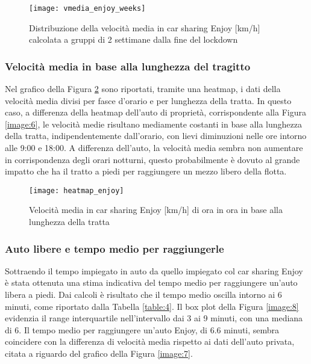 \begin{figure}
	\centering
	\texttt{[image: vmedia\_enjoy\_weeks]}
	\caption{Distribuzione della velocità media in car sharing Enjoy [km/h] calcolata a gruppi di 2 settimane dalla fine del lockdown}
	\label{image:28}
\end{figure}

\subsubsection{Velocità media in base alla lunghezza del tragitto}

Nel grafico della Figura \ref{image:30} sono riportati, tramite una heatmap, i dati della velocità media divisi per fasce d'orario e per lunghezza della tratta. In questo caso, a differenza della heatmap dell'auto di proprietà, corrispondente alla Figura \ref{image:6}, le velocità medie risultano mediamente costanti in base alla lunghezza della tratta, indipendentemente dall'orario, con lievi diminuzioni nelle ore intorno alle 9:00 e 18:00. A differenza dell'auto, la velocità media sembra non aumentare in corrispondenza degli orari notturni, questo probabilmente è dovuto al grande impatto che ha il tratto a piedi per raggiungere un mezzo libero della flotta.

\begin{figure}[H]
	\centering
	\texttt{[image: heatmap\_enjoy]}
	\caption{Velocità media in car sharing Enjoy [km/h] di ora in ora in base alla lunghezza della tratta}
	\label{image:30}
\end{figure}

\subsubsection{Auto libere e tempo medio per raggiungerle}

Sottraendo il tempo impiegato in auto da quello impiegato col car sharing Enjoy è stata ottenuta una stima indicativa del tempo medio per raggiungere un'auto libera a piedi. Dai calcoli è risultato che il tempo medio oscilla intorno ai 6 minuti, come riportato dalla Tabella \ref{table:4}. Il box plot della Figura \ref{image:8} evidenzia il range interquartile nell'intervallo dai 3 ai 9 minuti, con una mediana di 6. Il tempo medio per raggiungere un'auto Enjoy, di 6.6 minuti, sembra coincidere con la differenza di velocità media rispetto ai dati dell'auto privata, citata a riguardo del grafico della Figura \ref{image:7}.

